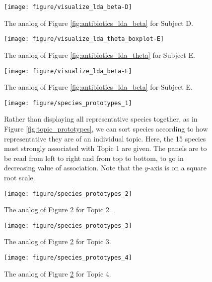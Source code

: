 \documentclass[oupdraft]{bio}
\begin{document}
\begin{figure}[!p]
  \centering\texttt{[image: figure/visualize\_lda\_beta-D]}
  \caption{The analog of Figure \ref{fig:antibiotics_lda_beta} for Subject D.}
\end{figure}

\begin{figure}[!p]
  \centering\texttt{[image: figure/visualize\_lda\_theta\_boxplot-E]}
  \caption{The analog of Figure \ref{fig:antibiotics_lda_theta} for Subject E.}
\end{figure}

\begin{figure}[!p]
  \centering\texttt{[image: figure/visualize\_lda\_beta-E]}
  \caption{The analog of Figure \ref{fig:antibiotics_lda_beta} for Subject E. \label{fig:antibiotics_lda_beta_E}}
\end{figure}

\begin{figure}[!p]
  \centering
  \texttt{[image: figure/species\_prototypes\_1]}
  \caption{Rather than displaying all representative species together, as in
    Figure \ref{fig:topic_prototypes}, we can sort species according to how
    representative they are of an individual topic. Here, the 15 species most
    strongly associated with Topic 1 are given. The panels are to be read from
    left to right and from top to bottom, to go in decreasing value of
    association. Note that the $y$-axis is on a square root
    scale. \label{fig:species_prototypes_1} }
\end{figure}

\begin{figure}[!p]
  \centering
  \texttt{[image: figure/species\_prototypes\_2]}
  \caption{The analog of Figure \ref{fig:species_prototypes_1} for Topic
    2.\label{fig:species_prototypes_2}. }
\end{figure}

\begin{figure}[!p]
  \centering
  \texttt{[image: figure/species\_prototypes\_3]}
  \caption{The analog of Figure \ref{fig:species_prototypes_1} for Topic
    3. \label{fig:species_prototypes_3} }
\end{figure}

\begin{figure}[!p]
  \centering
  \texttt{[image: figure/species\_prototypes\_4]}
  \caption{The analog of Figure \ref{fig:species_prototypes_1} for Topic
    4. \label{fig:species_prototypes_4} }
\end{figure}
\end{document}
